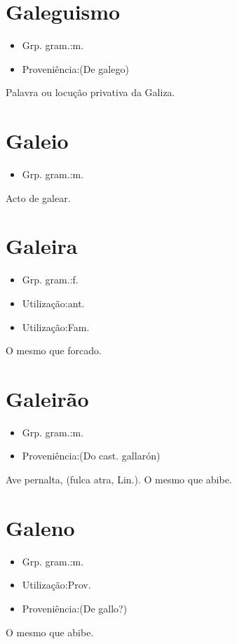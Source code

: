 \section{Galeguismo}
\begin{itemize}
\item {Grp. gram.:m.}
\end{itemize}
\begin{itemize}
\item {Proveniência:(De \textunderscore galego\textunderscore )}
\end{itemize}
Palavra ou locução privativa da Galiza.
\section{Galeio}
\begin{itemize}
\item {Grp. gram.:m.}
\end{itemize}
Acto de galear.
\section{Galeira}
\begin{itemize}
\item {Grp. gram.:f.}
\end{itemize}
\begin{itemize}
\item {Utilização:ant.}
\end{itemize}
\begin{itemize}
\item {Utilização:Fam.}
\end{itemize}
O mesmo que \textunderscore forcado\textunderscore .
\section{Galeirão}
\begin{itemize}
\item {Grp. gram.:m.}
\end{itemize}
\begin{itemize}
\item {Proveniência:(Do cast. \textunderscore gallarón\textunderscore )}
\end{itemize}
Ave pernalta, (\textunderscore fulca atra\textunderscore , Lin.).
O mesmo que \textunderscore abibe\textunderscore .
\section{Galeno}
\begin{itemize}
\item {Grp. gram.:m.}
\end{itemize}
\begin{itemize}
\item {Utilização:Prov.}
\end{itemize}
\begin{itemize}
\item {Proveniência:(De \textunderscore gallo\textunderscore ?)}
\end{itemize}
O mesmo que \textunderscore abibe\textunderscore .
